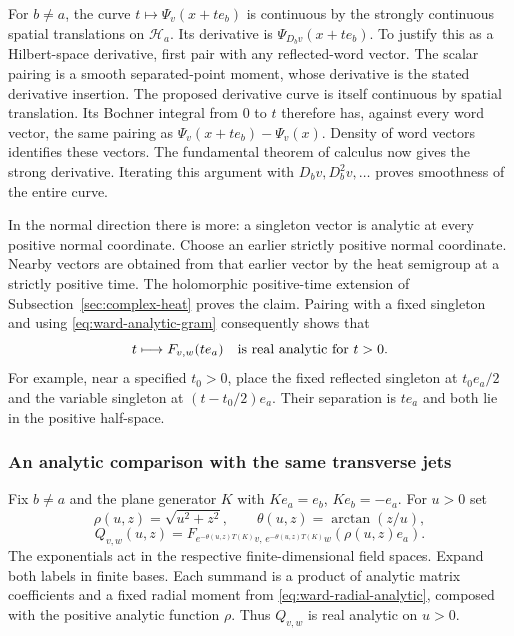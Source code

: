 For $b\ne a$, the curve $t\mapsto\Psi_v(x+te_b)$ is continuous by the
strongly continuous spatial translations on $\mathcal H_a$. Its derivative
is $\Psi_{D_bv}(x+te_b)$. To justify this as a Hilbert-space derivative,
first pair with any reflected-word vector. The scalar pairing is a smooth
separated-point moment, whose derivative is the stated derivative
insertion. The proposed derivative curve is itself continuous by spatial
translation. Its Bochner integral from $0$ to $t$ therefore has, against
every word vector, the same pairing as
$\Psi_v(x+te_b)-\Psi_v(x)$. Density of word vectors identifies these
vectors. The fundamental theorem of calculus now gives the strong
derivative. Iterating this argument with $D_bv,D_b^2v,\ldots$ proves
smoothness of the entire curve.

In the normal direction there is more: a singleton vector is analytic at
every positive normal coordinate. Choose an earlier strictly positive
normal coordinate. Nearby vectors are obtained from that earlier vector
by the heat semigroup at a strictly positive time. The holomorphic
positive-time extension of Subsection~\ref{sec:complex-heat} proves the
claim. Pairing with a fixed singleton and using
\eqref{eq:ward-analytic-gram} consequently shows that
\begin{equation}\label{eq:ward-radial-analytic}
 t\longmapsto F_{v,w}(te_a)
 \quad\hbox{is real analytic for }t>0.
\end{equation}
For example, near a specified $t_0>0$, place the fixed reflected singleton
at $t_0e_a/2$ and the variable singleton at $(t-t_0/2)e_a$.
Their separation is $te_a$ and both lie in the positive half-space.

\subsubsection{An analytic comparison with the same transverse jets}

Fix $b\ne a$ and the plane generator $K$ with
$Ke_a=e_b$, $Ke_b=-e_a$. For $u>0$ set
\[
 \rho(u,z)=\sqrt{u^2+z^2},\qquad
 \theta(u,z)=\arctan(z/u),
\]
\[
 Q_{v,w}(u,z)=
 F_{e^{-\theta(u,z)T(K)}v,\,e^{-\theta(u,z)T(K)}w}
                    (\rho(u,z)e_a).
\]
The exponentials act in the respective finite-dimensional field spaces.
Expand both labels in finite bases. Each summand is a product of analytic
matrix coefficients and a fixed radial moment from
\eqref{eq:ward-radial-analytic}, composed with the positive analytic
function $\rho$. Thus $Q_{v,w}$ is real analytic on $u>0$.

